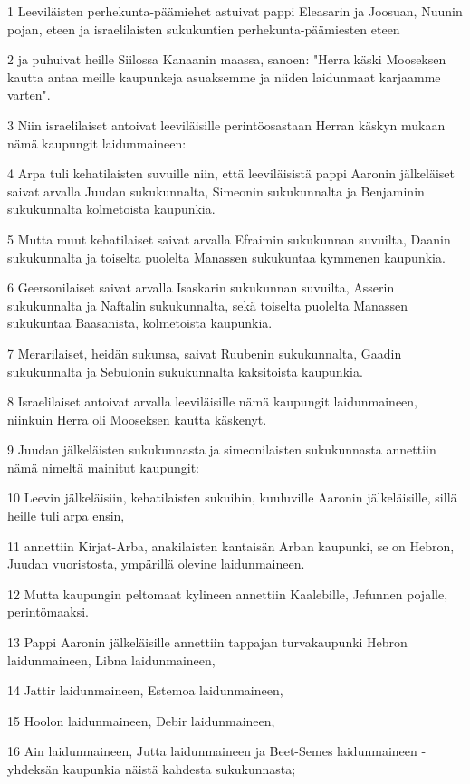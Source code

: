 \par 1 Leeviläisten perhekunta-päämiehet astuivat pappi Eleasarin ja Joosuan, Nuunin pojan, eteen ja israelilaisten sukukuntien perhekunta-päämiesten eteen
\par 2 ja puhuivat heille Siilossa Kanaanin maassa, sanoen: "Herra käski Mooseksen kautta antaa meille kaupunkeja asuaksemme ja niiden laidunmaat karjaamme varten".
\par 3 Niin israelilaiset antoivat leeviläisille perintöosastaan Herran käskyn mukaan nämä kaupungit laidunmaineen:
\par 4 Arpa tuli kehatilaisten suvuille niin, että leeviläisistä pappi Aaronin jälkeläiset saivat arvalla Juudan sukukunnalta, Simeonin sukukunnalta ja Benjaminin sukukunnalta kolmetoista kaupunkia.
\par 5 Mutta muut kehatilaiset saivat arvalla Efraimin sukukunnan suvuilta, Daanin sukukunnalta ja toiselta puolelta Manassen sukukuntaa kymmenen kaupunkia.
\par 6 Geersonilaiset saivat arvalla Isaskarin sukukunnan suvuilta, Asserin sukukunnalta ja Naftalin sukukunnalta, sekä toiselta puolelta Manassen sukukuntaa Baasanista, kolmetoista kaupunkia.
\par 7 Merarilaiset, heidän sukunsa, saivat Ruubenin sukukunnalta, Gaadin sukukunnalta ja Sebulonin sukukunnalta kaksitoista kaupunkia.
\par 8 Israelilaiset antoivat arvalla leeviläisille nämä kaupungit laidunmaineen, niinkuin Herra oli Mooseksen kautta käskenyt.
\par 9 Juudan jälkeläisten sukukunnasta ja simeonilaisten sukukunnasta annettiin nämä nimeltä mainitut kaupungit:
\par 10 Leevin jälkeläisiin, kehatilaisten sukuihin, kuuluville Aaronin jälkeläisille, sillä heille tuli arpa ensin,
\par 11 annettiin Kirjat-Arba, anakilaisten kantaisän Arban kaupunki, se on Hebron, Juudan vuoristosta, ympärillä olevine laidunmaineen.
\par 12 Mutta kaupungin peltomaat kylineen annettiin Kaalebille, Jefunnen pojalle, perintömaaksi.
\par 13 Pappi Aaronin jälkeläisille annettiin tappajan turvakaupunki Hebron laidunmaineen, Libna laidunmaineen,
\par 14 Jattir laidunmaineen, Estemoa laidunmaineen,
\par 15 Hoolon laidunmaineen, Debir laidunmaineen,
\par 16 Ain laidunmaineen, Jutta laidunmaineen ja Beet-Semes laidunmaineen - yhdeksän kaupunkia näistä kahdesta sukukunnasta;
